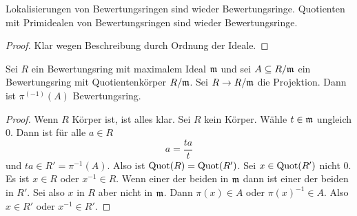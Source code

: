 \begin{Lemma}
	Lokalisierungen von Bewertungsringen sind wieder Bewertungsringe. Quotienten mit Primidealen von Bewertungsringen
	sind wieder Bewertungsringe.
\end{Lemma}
\begin{proof}
	Klar wegen Beschreibung durch Ordnung der Ideale.
\end{proof}
\begin{Lemma}
	Sei \(R\) ein Bewertungsring mit maximalem Ideal \(\mathfrak{m}\) und sei \(A\subseteq R/\mathfrak{m}\) ein Bewertungsring
	mit Quotientenkörper \(R/\mathfrak{m}\). Sei \(R\to R/\mathfrak{m}\) die Projektion.
	Dann ist \(\pi^(-1)(A)\) Bewertungsring. 
\end{Lemma}
\begin{proof}
	
	Wenn \(R\) Körper ist, ist alles klar. Sei \(R\) kein Körper. Wähle \(t\in \mathfrak{m}\) ungleich \(0\).
	Dann ist für alle \(a\in R\) \[a=\frac{ta}{t}\] und \(ta\in R'=\pi^{-1}(A)\).
	Also ist \(\operatorname{Quot}(R)=\operatorname{Quot}(R')\).
	Sei \(x\in\operatorname{Quot}(R')\) nicht \(0\). Es ist \(x\in R\) oder \(x^{-1}\in R\).
	Wenn einer der beiden in \(\mathfrak{m}\) dann ist einer der beiden in \(R'\).
	Sei also \(x\) in \(R\) aber nicht in \(\mathfrak{m}\). Dann \(\pi(x)\in A\) oder \(\pi(x)^{-1}\in A\).
	Also \(x\in R'\) oder \(x^{-1}\in R'\).
\end{proof}

